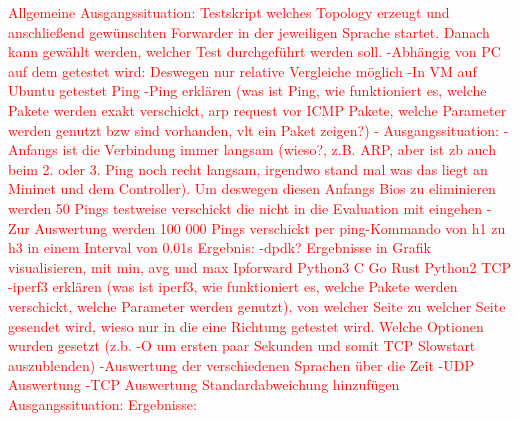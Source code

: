 \textcolor{red}{Allgemeine Ausgangssituation: 
Testskript welches Topology erzeugt und anschließend gewünschten Forwarder in der jeweiligen Sprache startet. Danach kann gewählt werden, welcher Test durchgeführt werden soll. 
-Abhängig von PC auf dem getestet wird: Deswegen nur relative Vergleiche möglich 
-In VM auf Ubuntu getestet
Ping
-Ping erklären (was ist Ping, wie funktioniert es, welche Pakete werden exakt verschickt, arp request vor ICMP Pakete, welche Parameter werden genutzt bzw sind vorhanden, vlt ein Paket zeigen?)
-
Ausgangssituation:
	- Anfangs ist die Verbindung immer langsam (wieso?, z.B. ARP, aber ist zb auch beim 2. oder 3. Ping noch recht langsam, irgendwo stand mal was das liegt an Mininet und dem Controller). Um deswegen diesen Anfangs Bios zu eliminieren werden 50 Pings testweise verschickt die nicht in die Evaluation mit eingehen
	- Zur Auswertung werden 100 000 Pings verschickt per ping-Kommando von h1 zu h3 in einem Interval von 0.01s
Ergebnis:
-dpdk?
Ergebnisse in Grafik visualisieren, mit min, avg und max
Ipforward
Python3
C	
Go	
Rust	
Python2	
TCP
-iperf3 erklären (was ist iperf3, wie funktioniert es, welche Pakete werden verschickt, welche Parameter werden genutzt), von welcher Seite zu welcher Seite gesendet wird, wieso nur in die eine Richtung getestet wird. Welche Optionen wurden gesetzt (z.b. -O um ersten paar Sekunden und somit TCP Slowstart auszublenden)
-Auswertung der verschiedenen Sprachen über die Zeit
-UDP Auswertung
-TCP Auswertung Standardabweichung hinzufügen
Ausgangssituation:
Ergebnisse:}
